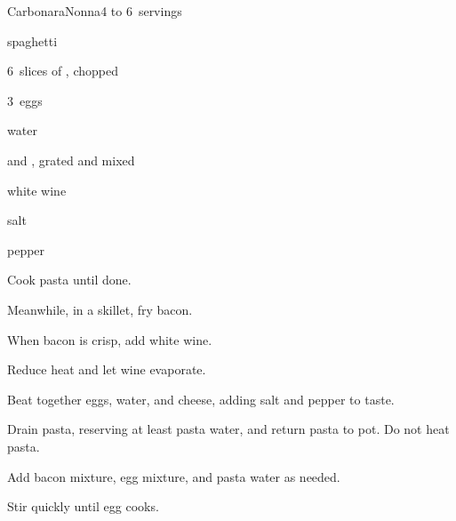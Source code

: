 \begin{recipe}{Carbonara}{Nonna}{4 to 6~servings}

\begin{ingredients}
\item {} spaghetti
\item 6~slices of , chopped
\item 3~eggs
\item \C{\half} water
\item \C{\twothird}  and , grated and mixed
\item \C{\half} white wine
\item salt
\item pepper
\end{ingredients}

\begin{directions}
\item Cook pasta until done.
\item Meanwhile, in a skillet, fry bacon.
\item When bacon is crisp, add white wine.
\item Reduce heat and let wine evaporate.
\item Beat together eggs, water, and cheese, adding salt and pepper to taste.
\item Drain pasta, reserving at least  pasta water, and return pasta to pot. Do not heat pasta.
\item Add bacon mixture, egg mixture, and pasta water as needed.
\item Stir quickly until egg cooks.
\end{directions}

\end{recipe}
